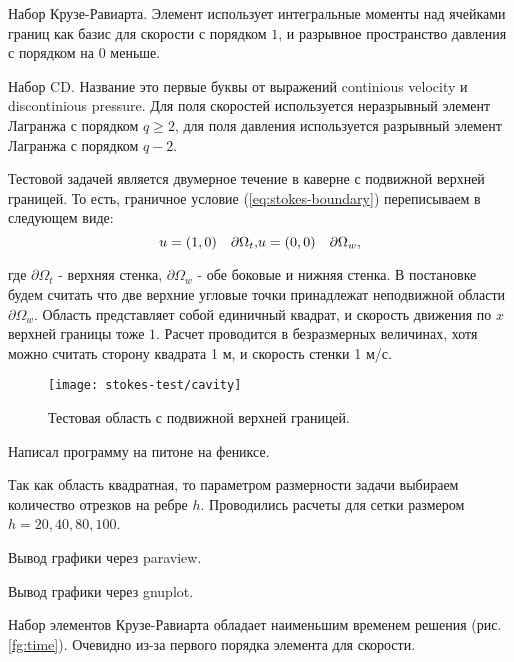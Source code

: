 \documentclass[12pt]{article}
\begin{document}
Набор Крузе-Равиарта.
Элемент использует интегральные моменты над ячейками границ как базис для скорости с порядком $1$, и разрывное пространство давления с порядком на $0$ меньше.

Набор CD.
Название это первые буквы от выражений continious velocity и discontinious pressure.
Для поля скоростей используется неразрывный элемент Лагранжа с порядком $q \geq 2$, для поля давления используется разрывный элемент Лагранжа с порядком $q-2$. 

Тестовой задачей является двумерное течение в каверне с подвижной верхней границей. То есть, граничное условие (\ref{eq:stokes-boundary}) переписываем в следующем виде:
\begin{equation}
u = (1, 0) \quad \partial\Omega_{t},
$$$$
u = (0, 0) \quad \partial\Omega_{w},
\end{equation}

где $\partial\Omega_{t}$ - верхняя стенка, $\partial\Omega_{w}$ - обе боковые и нижняя стенка. В постановке будем считать что две верхние угловые точки принадлежат неподвижной области $\partial\Omega_{w}$. Область представляет собой единичный квадрат, и скорость движения по $x$ верхней границы тоже $1$. Расчет проводится в безразмерных величинах, хотя можно считать сторону квадрата 1 м, и скорость стенки 1 м/с.

\begin{figure}
\texttt{[image: stokes-test/cavity]}
\caption{Тестовая область с подвижной верхней границей.}
\label{fg:cavity}
\end{figure}

Написал программу на питоне на фениксе.

Так как область квадратная, то параметром размерности задачи выбираем количество отрезков на ребре $h$. Проводились расчеты для сетки размером $h=20, 40, 80, 100$. 


Вывод графики через paraview.


Вывод графики через gnuplot.

Набор элементов Крузе-Равиарта обладает наименьшим временем решения (рис. \ref{fg:time}).
Очевидно из-за первого порядка элемента для скорости.
\end{document}
